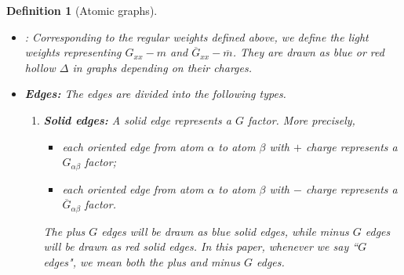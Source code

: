 \documentclass{article}
\newcommand{\1}{\mathds{1}}
\numberwithin{equation}{section}
\newcommand{\al}{\alpha}
\renewcommand{\cal}{\mathcal}
\DeclareMathOperator{\OO}{O}
\theoremstyle{plain} %
\newtheorem{definition}[theorem]{Definition}
\theoremstyle{remark}
\newcommand{\cor}{\color{red}}
\newcommand{\nc}{\normalcolor}
\newcommand{\hty}[1]{{\cor (ht: #1) }}
\begin{document}
\begin{definition}[Atomic graphs]
\begin{itemize}
 \item {}:  
Corresponding to the regular weights defined above, we define the light weights representing $G_{xx}-m$ and $\overline G_{xx}-\overline m$. %
They are drawn as blue or red hollow $\Delta$ in graphs depending on their charges. %

%


\item {\bf Edges:} The edges are divided into the following types. %

\begin{enumerate}


\item{\bf  Solid edges:} A solid edge represents a $G$ factor. More precisely, 
\begin{itemize}
\item each oriented edge from atom $\alpha$ to atom $\beta$ with $+$ charge represents a $G_{\al\beta}$ factor; 
\item each oriented edge from atom $\alpha$ to atom $\beta$ with $-$ charge represents a $\overline G_{\al\beta}$ factor.
\end{itemize}
The plus $G$ edges will be drawn as blue solid edges, while minus $G$ edges will be drawn as red solid edges. In this paper, whenever we say ``$G$ edges", we mean both the plus and minus $G$ edges.




\end{enumerate}
\end{itemize}
\end{definition}
\end{document}

